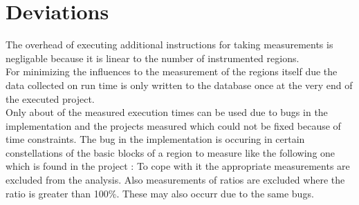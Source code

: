 \section{Deviations}
The overhead of executing additional instructions for taking measurements is negligable because it is linear to the number of instrumented regions. \\
For minimizing the influences to the measurement of the regions itself due the data collected on run time is only written to the database once at the very end of the executed project.\\
Only about  of the measured execution times can be used due to bugs in the implementation and the projects measured which could not be fixed because of time constraints.
The bug in the implementation is occuring in certain constellations of the basic blocks of a region to measure like the following one which is found in the project :
To cope with it the appropriate measurements are excluded from the analysis.
Also measurements of ratios are excluded where the ratio is greater than 100\%.
These may also occurr due to the same bugs.
